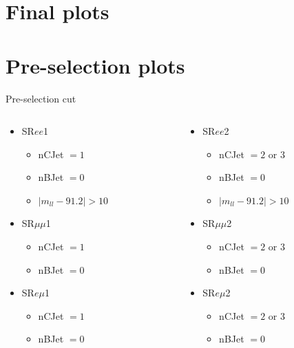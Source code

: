 \documentclass[mathserif,serif]{beamer}
\begin{document}
\section{Final plots}



\section{Pre-selection plots}
\begin{frame}{Pre-selection cut}
\normalsize
\begin{columns}
\begin{column}{0.5\textwidth}

\begin{itemize}
\item SR$ee$1
\begin{itemize}
\item nCJet $=1$
\item nBJet $=0$
\item $|m_{ll} - 91.2| > 10$
\end{itemize}
\item SR$\mu\mu$1
\begin{itemize}
\item nCJet $=1$
\item nBJet $=0$
\end{itemize}
\item SR$e\mu$1
\begin{itemize}
\item nCJet $=1$
\item nBJet $=0$
\end{itemize}
\end{itemize}

\end{column}
\begin{column}{0.5\textwidth}

\begin{itemize}
\item SR$ee$2
\begin{itemize}
\item nCJet $=2$ or $3$
\item nBJet $=0$
\item $|m_{ll} - 91.2| > 10$
\end{itemize}
\item SR$\mu\mu$2
\begin{itemize}
\item nCJet $=2$ or $3$
\item nBJet $=0$
\end{itemize}
\item SR$e\mu$2
\begin{itemize}
\item nCJet $=2$ or $3$
\item nBJet $=0$
\end{itemize}
\end{itemize}

\end{column}
\end{columns}
\end{frame}
\end{document}
